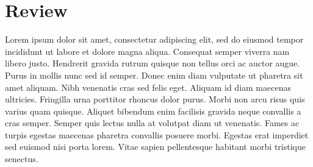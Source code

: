 
\chapter{Review}

Lorem ipsum dolor sit amet, consectetur adipiscing elit, sed do eiusmod tempor incididunt ut labore et dolore magna aliqua. Consequat semper viverra nam libero justo. Hendrerit gravida rutrum quisque non tellus orci ac auctor augue. Purus in mollis nunc sed id semper. Donec enim diam vulputate ut pharetra sit amet aliquam. Nibh venenatis cras sed felis eget. Aliquam id diam maecenas ultricies. Fringilla urna porttitor rhoncus dolor purus. Morbi non arcu risus quis varius quam quisque. Aliquet bibendum enim facilisis gravida neque convallis a cras semper. Semper quis lectus nulla at volutpat diam ut venenatis. Fames ac turpis egestas maecenas pharetra convallis posuere morbi. Egestas erat imperdiet sed euismod nisi porta lorem. Vitae sapien pellentesque habitant morbi tristique senectus.